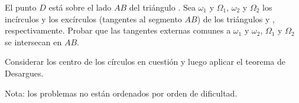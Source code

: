 \begin{section-problem}
    El punto $D$ está sobre el lado $AB$ del triángulo .
    Sea $\omega_1$ y $\Omega_1$, $\omega_2$ y $\Omega_2$ los incírculos y los excírculos (tangentes al segmento $AB$) de los triángulos  y , respectivamente.
    Probar que las tangentes externas comunes a $\omega_1$ y $\omega_2$, $\Omega_1$ y $\Omega_2$ se intersecan en $AB$.
\end{section-problem}

\begin{hint}
    Considerar los centro de los círculos en cuestión y luego aplicar el teorema de Desargues.
\end{hint}


Nota: los problemas no están ordenados por orden de dificultad.
